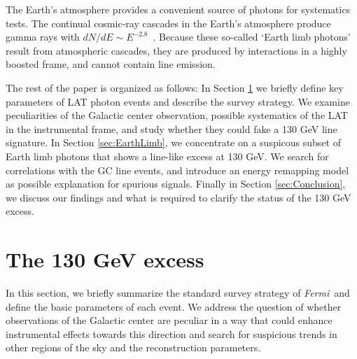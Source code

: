 \documentclass[aps,twocolumn,prd,superscriptaddress,showpacs,nofootinbib,fixfloat]{revtex4}
\newcommand{\Fermi}{{\slshape Fermi}}
\newcommand\Refsec[1]{Section \ref{sec:#1}}
\begin{document}
The Earth's atmosphere provides a convenient source of
photons for systematics tests.  The continual cosmic-ray
cascades in the Earth's atmosphere produce gamma rays with
$dN/dE \sim E^{-2.8}$~\citep{FermiLimb}.  Because these
so-called `Earth limb photons' result from atmospheric
cascades, they are produced by interactions in a highly
boosted frame, and cannot contain line emission.
\medskip

The rest of the paper is organized as follows: In \Refsec{130GeV} we briefly
define key parameters of LAT photon events and describe the survey strategy.
We examine peculiarities of the Galactic center observation, possible
systematics of the LAT in the instrumental frame, and study whether they could
fake a 130 GeV line signature. In \Refsec{EarthLimb}, we concentrate on a
suspicous subset of Earth limb photons that shows a line-like excess at 130
GeV. We search for correlations with the GC line events, and introduce an
energy remapping model as possible explanation for spurious signals.  Finally in
\Refsec{Conclusion}, we discuss our findings and what is required to clarify
the status of the 130 GeV excess.





\section{The 130 GeV excess}
\label{sec:130GeV}
In this section, we briefly summarize the standard survey strategy of \Fermi\ 
and define the basic parameters of each event.  We
address the question of whether observations of the Galactic center
are peculiar in a way that could enhance instrumental
effects towards this direction and search for suspicious trends in
other regions of the sky and the reconstruction parameters.

\end{document}

